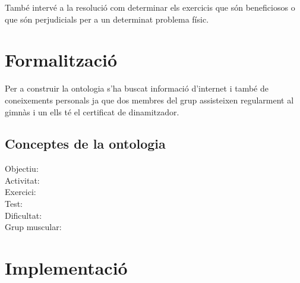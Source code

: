 \documentclass[a4paper, 12pt, UTF8]{article}
\begin{document}
També intervé a la resolució com determinar els exercicis que són beneficiosos o que són perjudicials per a un determinat problema físic. 

\section{Formalització}

Per a construir la ontologia s'ha buscat informació d'internet i també de coneixements personals ja que dos membres del grup assisteixen regularment al gimnàs i un ells té el certificat de dinamitzador. 

\subsection{Conceptes de la ontologia}

\begin{description}
	\item[Objectiu:] 
	\item[Activitat:]
	\item[Exercici:]
	\item[Test:]
	\item[Dificultat:]
	\item[Grup muscular:]
\end{description}

\section{Implementació}
\end{document}

